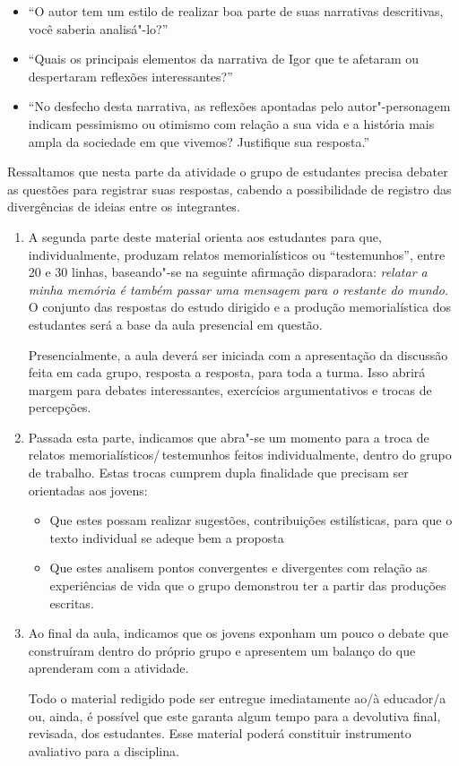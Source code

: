 \documentclass[11pt]{extarticle}
\begin{document}
\begin{itemize}
\item ``O autor tem um estilo de realizar boa parte de
suas narrativas descritivas, você saberia analisá"-lo?''

\item ``Quais os
principais elementos da narrativa de Igor que te afetaram ou despertaram
reflexões interessantes?''

\item ``No desfecho desta narrativa, as reflexões
apontadas pelo autor"-personagem indicam pessimismo ou otimismo com
relação a sua vida e a história mais ampla da sociedade em que vivemos?
Justifique sua resposta.'' 
\end{itemize}

Ressaltamos que nesta parte da atividade o
grupo de estudantes precisa debater as questões para registrar suas
respostas, cabendo a possibilidade de registro das divergências de
ideias entre os integrantes.

\begin{enumerate}
\item A segunda parte deste material orienta aos estudantes para que,
individualmente, produzam relatos memorialísticos ou ``testemunhos'',
entre 20 e 30 linhas, baseando"-se na seguinte afirmação disparadora:
\emph{relatar a minha memória é também passar uma mensagem para o restante do
mundo}. O conjunto das respostas do estudo dirigido e a produção
memorialística dos estudantes será a base da aula presencial em questão.

Presencialmente, a aula deverá ser iniciada com a apresentação da
discussão feita em cada grupo, resposta a resposta, para toda a turma.
Isso abrirá margem para debates interessantes, exercícios argumentativos
e trocas de percepções. 

\item Passada esta parte, indicamos que abra"-se um
momento para a troca de relatos memorialísticos/\,testemunhos feitos
individualmente, dentro do grupo de trabalho. Estas trocas cumprem dupla
finalidade que precisam ser orientadas aos jovens: 

\begin{itemize}
\item Que estes possam
realizar sugestões, contribuições estilísticas, para que o texto
individual se adeque bem a proposta
\item Que estes analisem pontos
convergentes e divergentes com relação as experiências de vida que o
grupo demonstrou ter a partir das produções escritas. 
\end{itemize}

\item Ao final da aula,
indicamos que os jovens exponham um pouco o debate que construíram
dentro do próprio grupo e apresentem um balanço do que aprenderam com a
atividade.

Todo o material redigido pode ser entregue imediatamente ao/à educador/a
ou, ainda, é possível que este garanta algum tempo para a devolutiva
final, revisada, dos estudantes. Esse material poderá constituir
instrumento avaliativo para a disciplina.
\end{enumerate}
\end{document}
